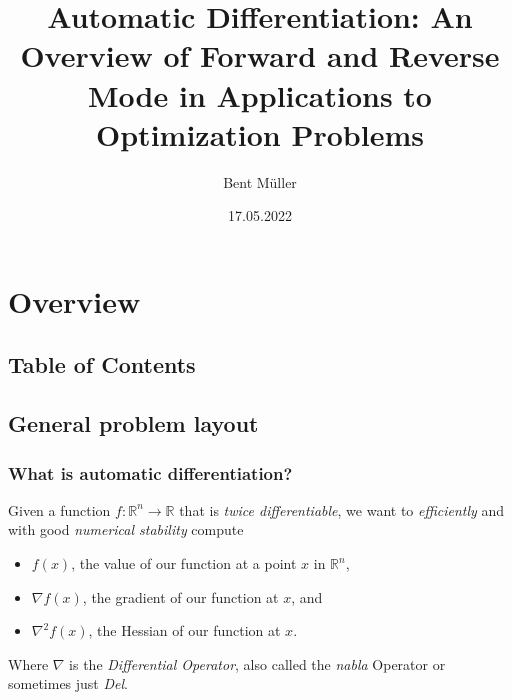 \documentclass[compress]{beamer}
\title{
	Automatic Differentiation:
	An Overview of Forward and Reverse Mode
	in Applications to Optimization Problems
}
\author{Bent Müller}
\institute{University of Hamburg}
\date{17.05.2022}
\def\R{{\mathbb R}}
\begin{document}
\begin{frame}
	\titlepage
\end{frame}

\section{Overview}
\subsection{Table of Contents}
\begin{frame}
	\tableofcontents
\end{frame}

\subsection{General problem layout}

\begin{frame}
	\frametitle{What is automatic differentiation?}

	Given a function $f: \R^{n} \longrightarrow \R$ that is
	\textit{twice differentiable}, we want to
	\textit{efficiently}
	and with good \textit{numerical stability} compute
	\vspace{5mm}

	\begin{itemize}
		\item $f(x)$, the value of our function at a point $x$ in $\R^{n}$,
		\item $\nabla f(x)$, the gradient of our function at $x$, and
		\item $\nabla^2 f(x)$, the Hessian of our function at $x$.
	\end{itemize}

	\vspace{5mm}
	Where $\nabla$ is the \textit{Differential Operator}, also called
	the \textit{nabla} Operator or sometimes just \textit{Del}.
\end{frame}
\end{document}
